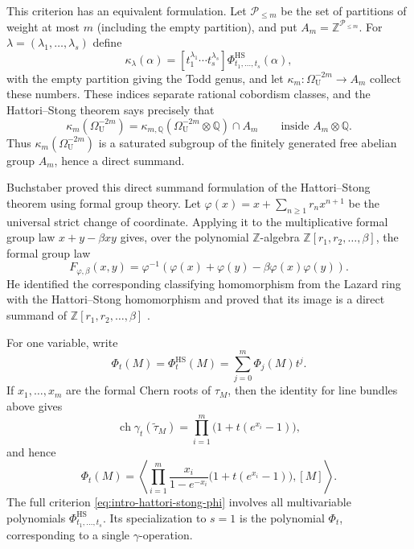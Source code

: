 \documentclass[14pt,dvipsnames]{extarticle}
\numberwithin{equation}{subsection}
\theoremstyle{plain}
\theoremstyle{definition}
\theoremstyle{definition}
\newcommand{\Uu}{\mathrm{U}}
\begin{document}
This criterion has an equivalent formulation. Let $\mathcal P_{\leq m}$ be the set of partitions
of weight at most $m$ (including the empty partition), and put
$A_m=\mathbb Z^{\mathcal P_{\leq m}}$.
For $\lambda=(\lambda_1,\ldots,\lambda_s)$ define
\[
 \kappa_\lambda(\alpha)
 =[t_1^{\lambda_1}\cdots t_s^{\lambda_s}]
 \Phi^{\mathrm{HS}}_{t_1,\ldots,t_s}(\alpha),
\]
with the empty partition giving the Todd genus, and let
$\kappa_m\colon \Omega_{\Uu}^{-2m}\to A_m$ collect these numbers. These indices separate
rational cobordism classes, and the Hattori--Stong theorem says precisely that
\begin{equation}\label{eq:intro-hattori-stong-saturated}
 \kappa_m(\Omega_{\Uu}^{-2m})
 =\kappa_{m,\mathbb Q}(\Omega_{\Uu}^{-2m}\otimes\mathbb Q)\cap A_m
 \qquad\text{inside }A_m\otimes\mathbb Q.
\end{equation}
Thus $\kappa_m(\Omega_{\Uu}^{-2m})$ is a saturated subgroup of the finitely generated free abelian group
$A_m$, hence a direct summand.

Buchstaber proved this direct summand formulation of the Hattori--Stong
theorem using formal group theory. Let
$\varphi(x)=x+\sum_{n\geq1}r_nx^{n+1}$ be the universal strict change of
coordinate. Applying it to the multiplicative formal group law
$x+y-\beta xy$ gives, over the polynomial $\mathbb Z$-algebra
$\mathbb Z[r_1,r_2,\ldots,\beta]$, the formal group law
\[
 F_{\varphi,\beta}(x,y)
 =\varphi^{-1}\!\left(\varphi(x)+\varphi(y)
          -\beta\varphi(x)\varphi(y)\right).
\]
He identified the corresponding classifying homomorphism from the Lazard ring
with the Hattori--Stong homomorphism and proved that its image is a direct
summand of $\mathbb Z[r_1,r_2,\ldots,\beta]$
\cite[Theorem~1.28 and \S7, Example~2]{Buc79Characteristic}.

For one variable, write
\[
 \Phi_t(M)=\Phi^{\mathrm{HS}}_t(M)
 =\sum_{j=0}^{m}\Phi_j(M)t^j.
\]
If $x_1,\ldots,x_m$ are the formal Chern roots of $\tau_M$, then the identity
for line bundles above gives
\[
 \operatorname{ch}\gamma_t(\widetilde\tau_M)
 =\prod_{i=1}^{m}\bigl(1+t(e^{x_i}-1)\bigr),
\]
and hence
\begin{equation}\label{eq:intro-Phi-roots}
 \Phi_t(M)
 =\left\langle
   \prod_{i=1}^{m}
    \frac{x_i}{1-e^{-x_i}}
    \bigl(1+t(e^{x_i}-1)\bigr),
   [M]
  \right\rangle.
\end{equation}
The full criterion \eqref{eq:intro-hattori-stong-phi} involves all
multivariable polynomials $\Phi^{\mathrm{HS}}_{t_1,\ldots,t_s}$. Its
specialization to $s=1$ is the polynomial $\Phi_t$, corresponding to a single
$\gamma$-operation.
\end{document}
